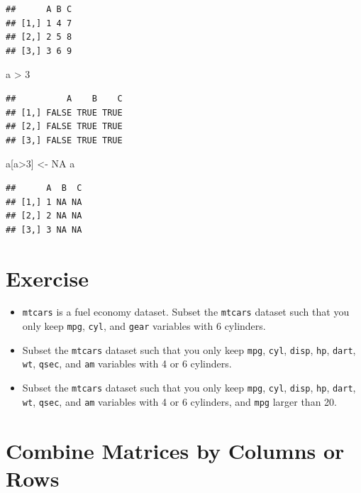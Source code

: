 \documentclass[]{book}
\newenvironment{Shaded}{\begin{snugshade}}{\end{snugshade}}
\newcommand{\DecValTok}[1]{\textcolor[rgb]{0.00,0.00,0.81}{{#1}}}
\newcommand{\StringTok}[1]{\textcolor[rgb]{0.31,0.60,0.02}{{#1}}}
\newcommand{\OtherTok}[1]{\textcolor[rgb]{0.56,0.35,0.01}{{#1}}}
\newcommand{\NormalTok}[1]{{#1}}
\begin{document}
\begin{verbatim}
##      A B C
## [1,] 1 4 7
## [2,] 2 5 8
## [3,] 3 6 9
\end{verbatim}

\begin{Shaded}
\begin{Highlighting}[]
\NormalTok{a >}\StringTok{ }\DecValTok{3}
\end{Highlighting}
\end{Shaded}

\begin{verbatim}
##          A    B    C
## [1,] FALSE TRUE TRUE
## [2,] FALSE TRUE TRUE
## [3,] FALSE TRUE TRUE
\end{verbatim}

\begin{Shaded}
\begin{Highlighting}[]
\NormalTok{a[a>}\DecValTok{3}\NormalTok{] <-}\StringTok{ }\OtherTok{NA}
\NormalTok{a}
\end{Highlighting}
\end{Shaded}

\begin{verbatim}
##      A  B  C
## [1,] 1 NA NA
## [2,] 2 NA NA
## [3,] 3 NA NA
\end{verbatim}

\section{Exercise}\label{exercise-4}

\begin{itemize}
\item
  \texttt{mtcars} is a fuel economy dataset. Subset the \texttt{mtcars}
  dataset such that you only keep \texttt{mpg}, \texttt{cyl}, and
  \texttt{gear} variables with 6 cylinders.
\item
  Subset the \texttt{mtcars} dataset such that you only keep
  \texttt{mpg}, \texttt{cyl}, \texttt{disp}, \texttt{hp}, \texttt{dart},
  \texttt{wt}, \texttt{qsec}, and \texttt{am} variables with 4 or 6
  cylinders.
\item
  Subset the \texttt{mtcars} dataset such that you only keep
  \texttt{mpg}, \texttt{cyl}, \texttt{disp}, \texttt{hp}, \texttt{dart},
  \texttt{wt}, \texttt{qsec}, and \texttt{am} variables with 4 or 6
  cylinders, and \texttt{mpg} larger than 20.
\end{itemize}

\section{Combine Matrices by Columns or
Rows}\label{combine-matrices-by-columns-or-rows}
\end{document}
